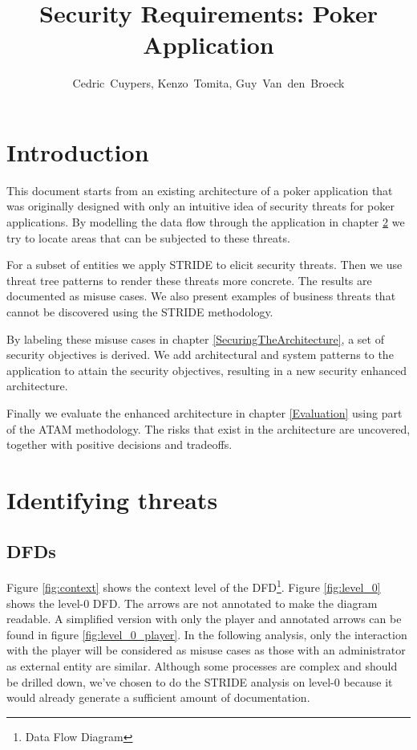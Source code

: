 \documentclass[a4paper,11pt]{report}
\author{Cedric~Cuypers, Kenzo~Tomita, Guy~Van~den~Broeck}
\title{Security Requirements: Poker Application}
\begin{document}
\maketitle
\tableofcontents

\listoffigures

\chapter{Introduction}
This document starts from an existing architecture of a poker application that was originally designed with only an intuitive idea of security threats for poker applications. By modelling the data flow through the application in chapter \ref{IdentifyingThreats} we try to locate areas that can be subjected to these threats.

For a subset of entities we apply STRIDE to elicit security threats. Then we use threat tree patterns to render these threats more concrete. The results are documented as misuse cases. We also present examples of business threats that cannot be discovered using the STRIDE methodology.

By labeling these misuse cases in chapter \ref{SecuringTheArchitecture}, a set of security objectives is derived. We add architectural and system patterns to the application to attain the security objectives, resulting in a new security enhanced architecture.

Finally we evaluate the enhanced architecture in chapter \ref{Evaluation} using part of the ATAM methodology. The risks that exist in the architecture are uncovered, together with positive decisions and tradeoffs.


\chapter{Identifying threats}
\label{IdentifyingThreats}
\section{DFDs}
Figure \ref{fig:context} shows the context level of the DFD\footnote{Data Flow Diagram}. Figure \ref{fig:level_0} shows the level-0 DFD. The arrows are not annotated to make the diagram readable. A simplified version with only the player and annotated arrows can be found in figure \ref{fig:level_0_player}. In the following analysis, only the interaction with the player will be considered as misuse cases as those with an administrator as external entity are similar. Although some processes are complex and should be drilled down, we've chosen to do the STRIDE analysis on level-0 because it would already generate a sufficient amount of documentation.
\end{document}
